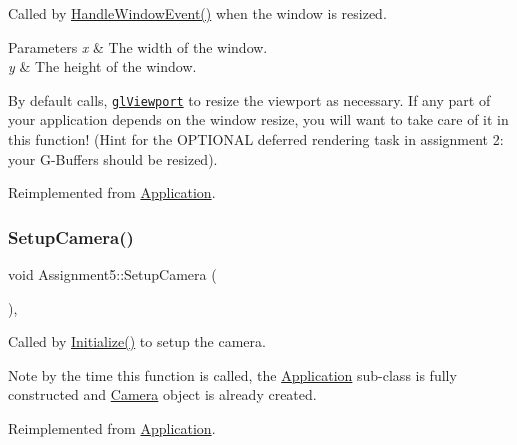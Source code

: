 Called by \hyperlink{class_application_a74d92db64e051efa56d0357989dcb755}{Handle\+Window\+Event()} when the window is resized.


\begin{DoxyParams}{Parameters}
{\em x} & The width of the window. \\
\hline
{\em y} & The height of the window.\\
\hline
\end{DoxyParams}
By default calls, \href{https://www.opengl.org/sdk/docs/man/html/glViewport.xhtml}{\tt gl\+Viewport} to resize the viewport as necessary. If any part of your application depends on the window resize, you will want to take care of it in this function! (Hint for the O\+P\+T\+I\+O\+N\+AL deferred rendering task in assignment 2\+: your \textquotesingle{}G-\/\+Buffers\textquotesingle{} should be resized).

Reimplemented from \hyperlink{class_application_abdba284a0f075ee1d4a2108c3a5236a2}{Application}.

\hypertarget{class_assignment5_a0c49123e133adfb36c769c943eae42fa}{}\label{class_assignment5_a0c49123e133adfb36c769c943eae42fa}
\subsubsection{\texorpdfstring{Setup\+Camera()}{SetupCamera()}}
{\footnotesize\ttfamily void Assignment5\+::\+Setup\+Camera (\begin{DoxyParamCaption}{ }\end{DoxyParamCaption})\hspace{0.3cm}{\ttfamily [private]}, {\ttfamily [virtual]}}



Called by \hyperlink{class_application_a17cf1ea4552d26a1c20f7d98d793d41d}{Initialize()} to setup the camera.

Note by the time this function is called, the \hyperlink{class_application}{Application} sub-\/class is fully constructed and \hyperlink{class_camera}{Camera} object is already created.

Reimplemented from \hyperlink{class_application_a2eb61ca027f223a5c5ad1bf982481193}{Application}.

\hypertarget{class_assignment5_ad2a3f3271ee7aa69dec95ccf7a95f224}{}\label{class_assignment5_ad2a3f3271ee7aa69dec95ccf7a95f224}
